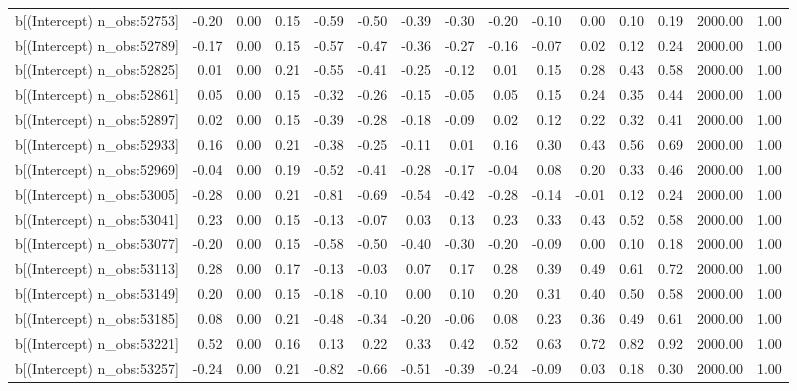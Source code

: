 \begin{table}[ht]
\begin{tabular}{rrrrrrrrrrrrrrr}
  b[(Intercept) n\_obs:52753] & -0.20 & 0.00 & 0.15 & -0.59 & -0.50 & -0.39 & -0.30 & -0.20 & -0.10 & 0.00 & 0.10 & 0.19 & 2000.00 & 1.00 \\ 
  b[(Intercept) n\_obs:52789] & -0.17 & 0.00 & 0.15 & -0.57 & -0.47 & -0.36 & -0.27 & -0.16 & -0.07 & 0.02 & 0.12 & 0.24 & 2000.00 & 1.00 \\ 
  b[(Intercept) n\_obs:52825] & 0.01 & 0.00 & 0.21 & -0.55 & -0.41 & -0.25 & -0.12 & 0.01 & 0.15 & 0.28 & 0.43 & 0.58 & 2000.00 & 1.00 \\ 
  b[(Intercept) n\_obs:52861] & 0.05 & 0.00 & 0.15 & -0.32 & -0.26 & -0.15 & -0.05 & 0.05 & 0.15 & 0.24 & 0.35 & 0.44 & 2000.00 & 1.00 \\ 
  b[(Intercept) n\_obs:52897] & 0.02 & 0.00 & 0.15 & -0.39 & -0.28 & -0.18 & -0.09 & 0.02 & 0.12 & 0.22 & 0.32 & 0.41 & 2000.00 & 1.00 \\ 
  b[(Intercept) n\_obs:52933] & 0.16 & 0.00 & 0.21 & -0.38 & -0.25 & -0.11 & 0.01 & 0.16 & 0.30 & 0.43 & 0.56 & 0.69 & 2000.00 & 1.00 \\ 
  b[(Intercept) n\_obs:52969] & -0.04 & 0.00 & 0.19 & -0.52 & -0.41 & -0.28 & -0.17 & -0.04 & 0.08 & 0.20 & 0.33 & 0.46 & 2000.00 & 1.00 \\ 
  b[(Intercept) n\_obs:53005] & -0.28 & 0.00 & 0.21 & -0.81 & -0.69 & -0.54 & -0.42 & -0.28 & -0.14 & -0.01 & 0.12 & 0.24 & 2000.00 & 1.00 \\ 
  b[(Intercept) n\_obs:53041] & 0.23 & 0.00 & 0.15 & -0.13 & -0.07 & 0.03 & 0.13 & 0.23 & 0.33 & 0.43 & 0.52 & 0.58 & 2000.00 & 1.00 \\ 
  b[(Intercept) n\_obs:53077] & -0.20 & 0.00 & 0.15 & -0.58 & -0.50 & -0.40 & -0.30 & -0.20 & -0.09 & 0.00 & 0.10 & 0.18 & 2000.00 & 1.00 \\ 
  b[(Intercept) n\_obs:53113] & 0.28 & 0.00 & 0.17 & -0.13 & -0.03 & 0.07 & 0.17 & 0.28 & 0.39 & 0.49 & 0.61 & 0.72 & 2000.00 & 1.00 \\ 
  b[(Intercept) n\_obs:53149] & 0.20 & 0.00 & 0.15 & -0.18 & -0.10 & 0.00 & 0.10 & 0.20 & 0.31 & 0.40 & 0.50 & 0.58 & 2000.00 & 1.00 \\ 
  b[(Intercept) n\_obs:53185] & 0.08 & 0.00 & 0.21 & -0.48 & -0.34 & -0.20 & -0.06 & 0.08 & 0.23 & 0.36 & 0.49 & 0.61 & 2000.00 & 1.00 \\ 
  b[(Intercept) n\_obs:53221] & 0.52 & 0.00 & 0.16 & 0.13 & 0.22 & 0.33 & 0.42 & 0.52 & 0.63 & 0.72 & 0.82 & 0.92 & 2000.00 & 1.00 \\ 
  b[(Intercept) n\_obs:53257] & -0.24 & 0.00 & 0.21 & -0.82 & -0.66 & -0.51 & -0.39 & -0.24 & -0.09 & 0.03 & 0.18 & 0.30 & 2000.00 & 1.00 \\ 

\end{tabular}
\end{table}
